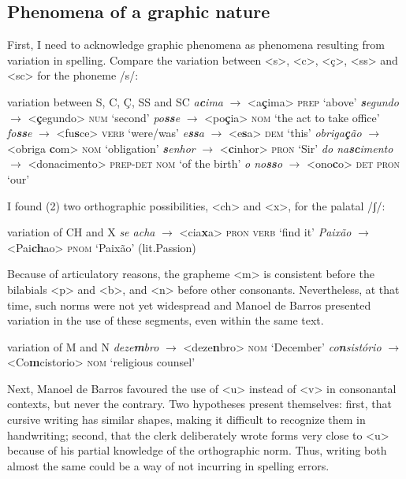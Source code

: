 \documentclass[output=paper,colorlinks,citecolor=brown]{langscibook}
\begin{document}
\subsection{Phenomena of a graphic nature}

First, I need to acknowledge graphic phenomena as phenomena resulting from variation in spelling. Compare the variation between <s>, <c>, <ç>, <ss> and <sc> for the phoneme /s/:

\ea variation between S, C, Ç, SS and SC\label{ex:6:1}
    \ea \emph{a\textbf{c}ima}         $\rightarrow$ <a\textbf{ç}ima>      \textsc{prep} ‘above’ 
    \ex \emph{\textbf{s}egundo}       $\rightarrow$ <\textbf{ç}egundo>    \textsc{num} ‘second’
    \ex \emph{po\textbf{ss}e}         $\rightarrow$ <po\textbf{ç}ia>      \textsc{nom} ‘the act to take office’
    \ex \emph{fo\textbf{ss}e}         $\rightarrow$ <fu\textbf{s}ce>      \textsc{verb} ‘were/was’
    \ex \emph{e\textbf{ss}a}          $\rightarrow$ <e\textbf{s}a>        \textsc{dem} ‘this’
    \ex \emph{obriga\textbf{ç}ão}     $\rightarrow$ <obriga \textbf{c}om> \textsc{nom} ‘obligation’
    \ex \emph{\textbf{s}enhor}        $\rightarrow$ <\textbf{c}inhor>     \textsc{pron} ‘Sir’
    \ex \emph{do na\textbf{sc}imento} $\rightarrow$ <donacimento>         \textsc{prep-det nom} ‘of the birth’
    \ex \emph{o no\textbf{ss}o}       $\rightarrow$ <ono\textbf{c}o>      \textsc{det pron} ‘our’
\z                                                                    
\z

I found (2) two orthographic possibilities, <ch> and <x>, for the palatal /ʃ/:

\ea\label{ex:6:2a} variation of CH and X
    \ea \emph{se acha} $\rightarrow$ <cia\textbf{x}a>  \textsc{pron verb} ‘find it’
    \ex \emph{Paixão} $\rightarrow$ <Pai\textbf{ch}ao> \textsc{pnom} ‘Paixão’ (lit.Passion)
\z
\z

Because of articulatory reasons, the grapheme <m> is consistent before the bilabials <p> and <b>, and <n> before other consonants. Nevertheless, at that time, such norms were not yet widespread and Manoel de Barros presented variation in the use of these segments, even within the same text.

\ea\label{ex:6:2b} variation of M and N
    \ea \emph{deze\textbf{m}bro} $\rightarrow$ <deze\textbf{n}bro> \textsc{nom} ‘December’
    \ex \emph{co\textbf{n}sistório} $\rightarrow$ <Co\textbf{m}cistorio> \textsc{nom} ‘religious counsel’
\z
\z

Next, Manoel de Barros favoured the use of <u> instead of <v> in consonantal contexts, but never the contrary. Two hypotheses present themselves: first, that cursive writing has similar shapes, making it difficult to recognize them in handwriting; second, that the clerk deliberately wrote forms very close to <u> because of his partial knowledge of the orthographic norm. Thus, writing both almost the same could be a way of not incurring in spelling errors.
\end{document}
